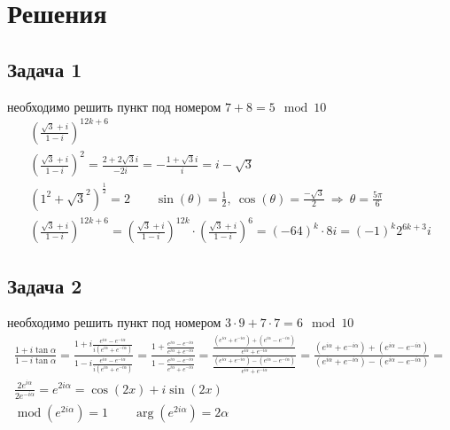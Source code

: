 
\newpage
\section*{Решения}
\subsection*{Задача 1}
	необходимо решить пункт под номером $7 + 8 = 5 \mod 10$
	\begin{gather*}
		\left(\frac{\sqrt{3} + i}{1 - i}\right)^{12k + 6}\\
		\left(\frac{\sqrt{3} + i}{1 - i}\right)^2 = 
		\frac{2 + 2\sqrt{3} i}{-2i} = -\frac{1 + \sqrt{3}i}{i} = 
		i - \sqrt{3}\\
		\left(1^2 + \sqrt{3}^2\right)^{\frac{1}{2}} = 
		2\qquad \sin(\theta) = 
		\frac{1}{2},\ \cos(\theta) = 
		\frac{-\sqrt{3}}{2}\ \Rightarrow\ \theta = 
		\frac{5\pi}{6}\\
		\left(\frac{\sqrt{3} + i}{1 - i}\right)^{12k + 6} = 
		\left(\frac{\sqrt{3} + i}{1 - i}\right)^{12k} \cdot \left(\frac{\sqrt{3} + i}{1 - i}\right)^{6} = 
		(-64)^k \cdot 8i = (-1)^k 2^{6k+3} i
	\end{gather*}
\vskip 0.4in

\subsection*{Задача 2}
	необходимо решить пункт под номером $3 \cdot 9 + 7 \cdot 7 = 6 \mod 10$
	\begin{gather*}
		\frac{1 + i \tan \alpha}{1 - i \tan \alpha} = 
		\frac{1 + i \frac{e^{i \alpha} - e^{-i \alpha}}{i(e^{i \alpha} + e^{-i \alpha})}}{1 - i \frac{e^{i \alpha} - e^{-i \alpha}}{i(e^{i \alpha} + e^{-i \alpha})}} =
		\frac{1 + \frac{e^{i \alpha} - e^{-i \alpha}}{e^{i \alpha} + e^{-i \alpha}}}{1 - \frac{e^{i \alpha} - e^{-i \alpha}}{e^{i \alpha} + e^{-i \alpha}}} =
		\frac{\frac{(e^{i \alpha} + e^{-i \alpha}) + (e^{i \alpha} - e^{-i \alpha})}{e^{i \alpha} + e^{-i \alpha}}}{\frac{(e^{i \alpha} + e^{-i \alpha}) - (e^{i \alpha} - e^{-i \alpha})}{e^{i \alpha} + e^{-i \alpha}}} =
		\frac{(e^{i \alpha} + e^{-i \alpha}) + (e^{i \alpha} - e^{-i \alpha})}{(e^{i \alpha} + e^{-i \alpha}) - (e^{i \alpha} - e^{-i \alpha})} =\\
		\frac{2e^{i \alpha}}{2e^{-i \alpha}} = e^{2i\alpha} = \cos(2x) + i\sin(2x)\\
		\operatorname{mod} (e^{2i\alpha}) = 1\qquad
		\operatorname{arg} (e^{2i\alpha}) = 2\alpha
	\end{gather*}
\vskip 0.4in

